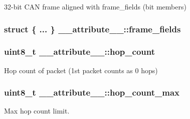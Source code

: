 32-\/bit C\+AN frame aligned with frame\+\_\+fields (bit members) 

\subsubsection[{\texorpdfstring{frame\+\_\+fields}{frame_fields}}]{\setlength{\rightskip}{0pt plus 5cm}struct \{ ... \}   \+\_\+\+\_\+attribute\+\_\+\+\_\+\+::frame\+\_\+fields}\hypertarget{struct____attribute_____acfc363edc99eccae8f7e0f523821305e}{}\label{struct____attribute_____acfc363edc99eccae8f7e0f523821305e}
\subsubsection[{\texorpdfstring{hop\+\_\+count}{hop_count}}]{\setlength{\rightskip}{0pt plus 5cm}uint8\+\_\+t \+\_\+\+\_\+attribute\+\_\+\+\_\+\+::hop\+\_\+count}\hypertarget{struct____attribute_____a80f0ddbd42fa6974b08feea40867db68}{}\label{struct____attribute_____a80f0ddbd42fa6974b08feea40867db68}


Hop count of packet (1st packet counts as 0 hops) 

\subsubsection[{\texorpdfstring{hop\+\_\+count\+\_\+max}{hop_count_max}}]{\setlength{\rightskip}{0pt plus 5cm}uint8\+\_\+t \+\_\+\+\_\+attribute\+\_\+\+\_\+\+::hop\+\_\+count\+\_\+max}\hypertarget{struct____attribute_____a73ca3679f26c67143ed190411c8347c6}{}\label{struct____attribute_____a73ca3679f26c67143ed190411c8347c6}


Max hop count limit. 


